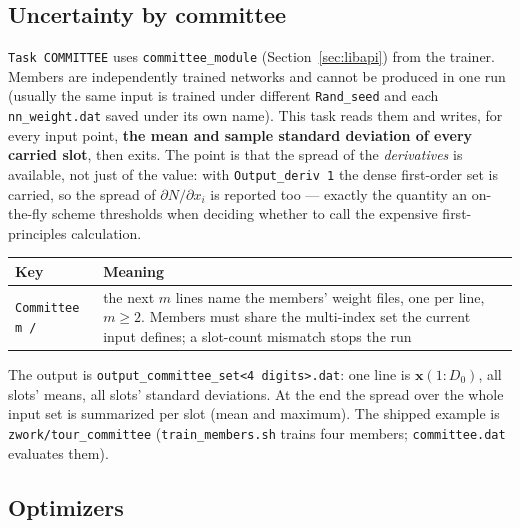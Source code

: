 \documentclass[10pt,a4paper]{article}
\newcommand{\code}[1]{\texttt{#1}}
\newcommand{\mi}[1]{\boldsymbol{#1}}
\begin{document}
\subsection{Uncertainty by committee}
\label{sec:committee}

\code{Task COMMITTEE} uses \code{committee\_module}
(Section~\ref{sec:libapi}) from the trainer. Members are
independently trained networks and cannot be produced in one run
(usually the same input is trained under different \code{Rand\_seed}
and each \code{nn\_weight.dat} saved under its own name). This task
reads them and writes, for every input point, \textbf{the mean and
sample standard deviation of every carried slot}, then exits. The
point is that the spread of the \emph{derivatives} is available, not
just of the value: with \code{Output\_deriv 1} the dense first-order
set is carried, so the spread of $\partial N/\partial x_i$ is
reported too --- exactly the quantity an on-the-fly scheme
thresholds when deciding whether to call the expensive
first-principles calculation.

\begin{longtable}{@{}p{}p{}@{}}
\toprule
Key & Meaning \\
\midrule
\endhead
\code{Committee m /} & the next $m$ lines name the members' weight files, one per line, $m\ge 2$. Members must share the multi-index set the current input defines; a slot-count mismatch stops the run\\
\bottomrule
\end{longtable}

The output is \code{output\_committee\_set<4 digits>.dat}: one line
is $\mi{x}(1{:}D_0)$, all slots' means, all slots' standard
deviations. At the end the spread over the whole input set is
summarized per slot (mean and maximum). The shipped example is
\code{zwork/tour\_committee} (\code{train\_members.sh} trains four
members; \code{committee.dat} evaluates them).

\subsection{Optimizers}
\end{document}
